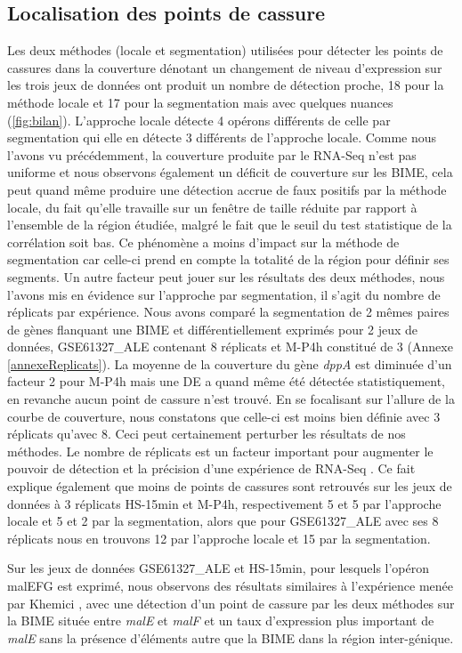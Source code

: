 \documentclass[12pt,a4paper]{report}
\begin{document}
\begin{onehalfspace}
\section*{Localisation des points de cassure}
Les deux méthodes (locale et segmentation) utilisées pour détecter les points de cassures dans la couverture dénotant un changement de niveau d'expression sur les trois jeux de données ont produit un nombre de détection proche, 18 pour la méthode locale et 17 pour la segmentation mais avec quelques nuances (\autoref{fig:bilan}). L'approche locale détecte 4 opérons différents de celle par segmentation qui elle en détecte 3 différents de l'approche locale. Comme nous l'avons vu précédemment, la couverture produite par le RNA-Seq n'est pas uniforme et nous observons également un déficit de couverture sur les BIME, cela peut quand même produire une détection accrue de faux positifs par la méthode locale, du fait qu'elle travaille sur un fenêtre de taille réduite par rapport à l'ensemble de la région étudiée, malgré le fait que le seuil du test statistique de la corrélation soit bas. Ce phénomène a moins d'impact sur la méthode de segmentation car celle-ci prend en compte la totalité de la région pour définir ses segments. Un autre facteur peut jouer sur les résultats des deux méthodes, nous l'avons mis en évidence sur l'approche par segmentation, il s'agit du nombre de réplicats par expérience. Nous avons comparé la segmentation de 2 mêmes paires de gènes flanquant une BIME et différentiellement exprimés pour 2 jeux de données, GSE61327\_ALE contenant 8 réplicats et M-P4h constitué de 3 (Annexe \ref{annexeReplicats}). La moyenne de la couverture du gène \textit{dppA} est diminuée d'un facteur 2 pour M-P4h mais une DE a quand même été détectée statistiquement, en revanche aucun point de cassure n'est trouvé. En se focalisant sur l'allure de la courbe de couverture, nous constatons que celle-ci est moins bien définie avec 3 réplicats qu'avec 8. Ceci peut certainement perturber les résultats de nos méthodes. Le nombre de réplicats est un facteur important pour augmenter le pouvoir de détection et la précision  d'une expérience de RNA-Seq \citep{Liu2014}. Ce fait explique également que moins de points de cassures sont retrouvés sur les jeux de données à 3 réplicats HS-15min et M-P4h, respectivement 5 et 5 par l'approche locale et 5 et 2 par la segmentation, alors que pour GSE61327\_ALE avec ses 8 réplicats nous en trouvons 12 par l'approche locale et 15 par la segmentation.

Sur les jeux de données GSE61327\_ALE et HS-15min, pour lesquels l'opéron malEFG est exprimé, nous observons des résultats similaires à l'expérience menée par Khemici \citep{Khemici2004}, avec une détection d'un point de cassure par les deux méthodes sur la BIME située entre \textit{malE} et \textit{malF} et un taux d'expression plus important de \textit{malE} sans la présence d'éléments autre que la BIME dans la région inter-génique.



\end{onehalfspace}
\end{document}
